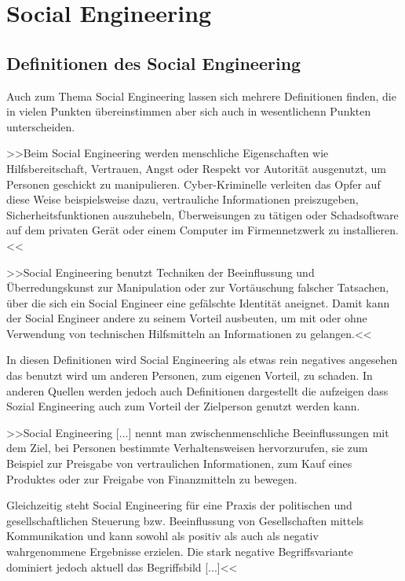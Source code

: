 \chapter{Social Engineering}\label{ch:SocialEngineering}

\section{Definitionen des Social Engineering}

Auch zum Thema Social Engineering lassen sich mehrere Definitionen finden, die in vielen Punkten übereinstimmen aber sich auch in wesentlichenn Punkten unterscheiden. 

>>Beim Social Engineering werden menschliche Eigenschaften wie Hilfsbereitschaft, Vertrauen, Angst oder Respekt vor Autorität ausgenutzt, um Personen geschickt zu manipulieren. Cyber-Kriminelle verleiten das Opfer auf diese Weise beispielsweise dazu, vertrauliche Informationen preiszugeben, Sicherheitsfunktionen auszuhebeln, Überweisungen zu tätigen oder Schadsoftware auf dem privaten Gerät oder einem Computer im Firmennetzwerk zu installieren.<<\cite{bsi}

>>Social Engineering benutzt Techniken der Beeinflussung und Überredungskunst zur Manipulation oder zur Vortäuschung falscher Tatsachen, über die sich ein Social Engineer eine gefälschte Identität aneignet. Damit kann der Social Engineer andere zu seinem Vorteil ausbeuten, um mit oder ohne Verwendung von technischen Hilfsmitteln an Informationen zu gelangen.<<\cite{mitn}

In diesen Definitionen wird Social Engineering als etwas rein negatives angesehen das benutzt wird um anderen Personen, zum eigenen Vorteil, zu schaden. In anderen Quellen werden jedoch auch Definitionen dargestellt die aufzeigen dass Sozial Engineering auch zum Vorteil der Zielperson genutzt werden kann.

>>Social Engineering [...] nennt man zwischenmenschliche Beeinflussungen mit dem Ziel, bei Personen bestimmte Verhaltensweisen hervorzurufen, sie zum Beispiel zur Preisgabe von vertraulichen Informationen, zum Kauf eines Produktes oder zur Freigabe von Finanzmitteln zu bewegen.

Gleichzeitig steht Social Engineering für eine Praxis der politischen und gesellschaftlichen Steuerung bzw. Beeinflussung von Gesellschaften mittels Kommunikation und kann sowohl als positiv als auch als negativ wahrgenommene Ergebnisse erzielen. Die stark negative Begriffsvariante dominiert jedoch aktuell das Begriffsbild [...]<<\cite{wiki}


